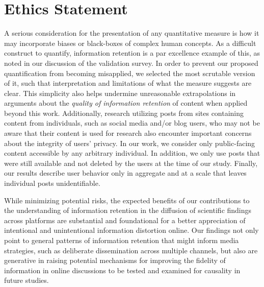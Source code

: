 \documentclass[letterpaper]{article} %
\begin{document}
\section{Ethics Statement}
A serious consideration for the presentation of any quantitative measure is how it may incorporate biases or black-boxes of complex human concepts. As a difficult construct to quantify, information retention is a par excellence example of this, as noted in our discussion of the validation survey. In order to prevent our proposed quantification from becoming misapplied, we selected the most scrutable version of it, such that interpretation and limitations of what the measure suggests are clear. This simplicity also helps undermine unreasonable extrapolations in arguments about the \emph{quality of information retention} of content when applied beyond this work.
Additionally, research utilizing posts from sites containing content from individuals, such as social media and/or blog users, who may not be aware that their content is used for research also encounter important concerns about the integrity of users' privacy. In our work, we consider only public-facing content accessible by any arbitrary individual. In addition, we only use posts that were still available and not deleted by the users at the time of our study. Finally, our results describe user behavior only in aggregate and at a scale that leaves individual posts unidentifiable.

While minimizing potential risks, the expected benefits of our contributions to the understanding of information retention in the diffusion of scientific findings across platforms are substantial and foundational for a better appreciation of intentional and unintentional information distortion online. Our findings not only point to general patterns of information retention that might inform media strategies, such as deliberate dissemination across multiple channels, but also are generative in raising potential mechanisms for improving the fidelity of information in online discussions to be tested and examined for causality in future studies.
\end{document}
